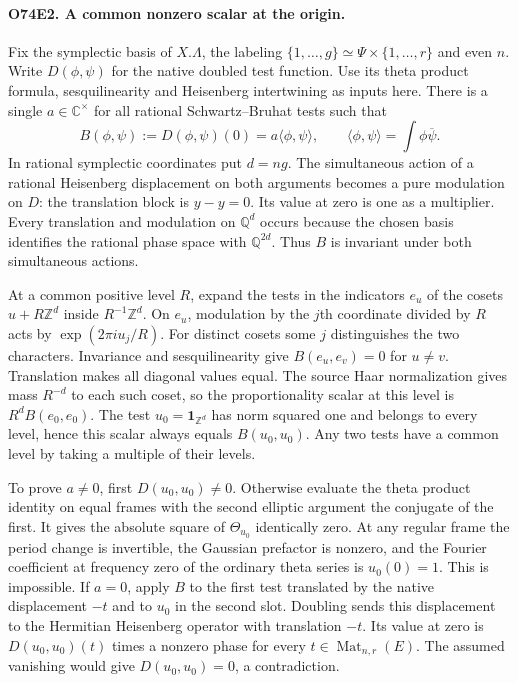 \paragraph{O74E2. A common nonzero scalar at the origin.}
Fix the symplectic basis of $X.\Lambda$, the labeling
$\{1,\ldots,g\}\simeq\Psi\times\{1,\ldots,r\}$ and even $n$.
Write $D(\phi,\psi)$ for the native doubled test function.
Use its theta product formula, sesquilinearity and Heisenberg
intertwining as inputs here. There is a single $a\in\mathbb C^\times$
for all rational Schwartz--Bruhat tests such that
\[
 B(\phi,\psi):=D(\phi,\psi)(0)=a\langle\phi,\psi\rangle,
 \qquad \langle\phi,\psi\rangle=\int\phi\overline\psi .
\]
In rational symplectic coordinates put $d=ng$. The simultaneous action
of a rational Heisenberg displacement on both arguments becomes a pure
modulation on $D$: the translation block is $y-y=0$. Its value at zero
is one as a multiplier. Every translation and modulation on
$\mathbb Q^d$ occurs because the chosen basis identifies the rational
phase space with $\mathbb Q^{2d}$. Thus $B$ is invariant under both
simultaneous actions.

At a common positive level $R$, expand the tests in the indicators
$e_u$ of the cosets $u+R\mathbb Z^d$ inside $R^{-1}\mathbb Z^d$.
On $e_u$, modulation by the $j$th coordinate divided by $R$ acts by
$\exp(2\pi i u_j/R)$. For distinct cosets some $j$ distinguishes the
two characters. Invariance and sesquilinearity give $B(e_u,e_v)=0$
for $u\ne v$. Translation makes all diagonal values equal. The
source Haar normalization gives mass $R^{-d}$ to each such coset,
so the proportionality scalar at this level is $R^d B(e_0,e_0)$.
The test $u_0=\mathbf1_{\mathbb Z^d}$ has norm squared one and belongs
to every level, hence this scalar always equals $B(u_0,u_0)$.
Any two tests have a common level by taking a multiple of their levels.

To prove $a\ne0$, first $D(u_0,u_0)\ne0$. Otherwise evaluate the
theta product identity on equal frames with the second elliptic
argument the conjugate of the first. It gives the absolute square
of $\Theta_{u_0}$ identically zero. At any regular frame the period
change is invertible, the Gaussian prefactor is nonzero, and the
Fourier coefficient at frequency zero of the ordinary theta series
is $u_0(0)=1$. This is impossible. If $a=0$, apply $B$ to the
first test translated by the native displacement $-t$ and to $u_0$
in the second slot. Doubling sends this displacement to the Hermitian
Heisenberg operator with translation $-t$. Its value at zero is
$D(u_0,u_0)(t)$ times a nonzero phase for every
$t\in\operatorname{Mat}_{n,r}(E)$. The assumed vanishing would give
$D(u_0,u_0)=0$, a contradiction.

